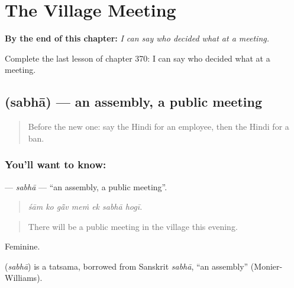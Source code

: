 
\chapter{The Village Meeting}
\label{ch:hi-the-village-meeting}

\begin{chapteropening}
\textbf{By the end of this chapter:} \emph{I can say who decided what at a meeting.}

Complete the last lesson of chapter 370: I can say who decided what at a meeting.
\end{chapteropening}

\section[\texorpdfstring{\hi{सभा} (sabhā)}{सभा (sabhā)}]{ (sabhā) — an assembly, a public meeting}

\label{lesson:HI-C370-sabha}



\begin{quote}
Before the new one: say the Hindi for an employee, then the Hindi for a ban.
\end{quote}

\subsection*{You'll want to know: }
\textbf{} — \emph{sabhā} — \textquotedblleft{}an assembly, a public meeting\textquotedblright{}.

\begin{quote}
      
\end{quote}

\begin{quote}
\emph{śām ko gā̃v meṁ ek sabhā hogī.}
\end{quote}

\begin{quote}
There will be a public meeting in the village this evening.
\end{quote}

Feminine.

\begin{cousinweb}
\textbf{} (\emph{sabhā}) is a tatsama, borrowed from Sanskrit \emph{sabhā}, \textquotedblleft{}an assembly\textquotedblright{} (Monier-Williams).
\end{cousinweb}


